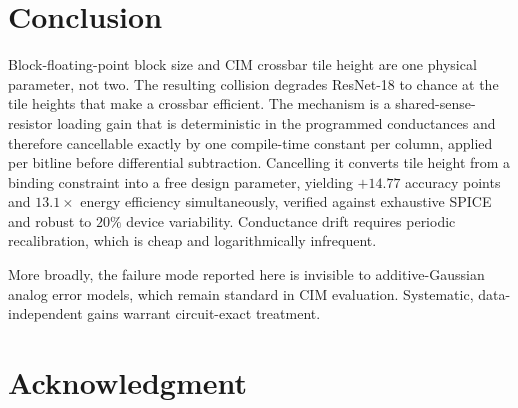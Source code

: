\documentclass[conference,10pt]{IEEEtran}
\begin{document}
\section{Conclusion}

Block-floating-point block size and CIM crossbar tile height are one physical
parameter, not two. The resulting collision degrades ResNet-18 to chance at the
tile heights that make a crossbar efficient. The mechanism is a
shared-sense-resistor loading gain that is deterministic in the programmed
conductances and therefore cancellable exactly by one compile-time constant per
column, applied per bitline before differential subtraction. Cancelling it
converts tile height from a binding constraint into a free design parameter,
yielding $+14.77$ accuracy points and $13.1\times$ energy efficiency
simultaneously, verified against exhaustive SPICE and robust to $20\%$ device
variability. Conductance drift requires periodic recalibration, which is cheap
and logarithmically infrequent.

More broadly, the failure mode reported here is invisible to additive-Gaussian
analog error models, which remain standard in CIM evaluation. Systematic,
data-independent gains warrant circuit-exact treatment.

\section*{Acknowledgment}

\end{document}

